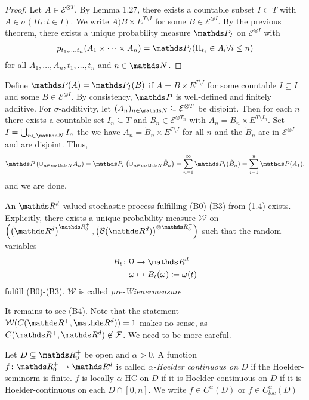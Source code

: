 \begin{proof}
Let $A \in \mathcal{E}^{\otimes T}$.
By Lemma 1.27, there exists a countable subset $I \subset T$ with $A \in \sigma(\Pi_t \colon t \in I)$.
We write $A)B \times E^{T \setminus I}$ for some $B \in \mathcal{E}^{\otimes I}$.
By the previous theorem, there exists a unique probability measure $\Prob_I$ on $\mathcal{E}^{\otimes I}$ with
\begin{align*}
p_{t_1,\dots,t_n}(A_1\times \dots \times A_n)=\Prob_I(\Pi_{t_i} \in A_i \forall i \leq n)
\end{align*}
for all $A_1,\dots,A_n,t_1,\dots,t_n$ and $n \in \N$.
\end{proof}
Define $\Prob(A)=\Prob_I(B)$ if $A=B \times E^{T\setminus I}$ for some countable $I\subseteq I$ and some $B \in \mathcal{E}^{\otimes I}$.
By consistency, $\Prob$ is well-defined and finitely additive.
For $\sigma$-additivity, let $(A_n)_{n\in \N}\subseteq \mathcal{E}^{\otimes T}$ be disjoint.
Then for each $n$ there exists a countable set $I_n \subseteq T$ and $B_n \in \mathcal{E}^{\otimes T_n}$ with $A_n=B_n \times E^{T\setminus I_n}$.
Set $I=\bigcup_{n\in \N}I_n$ the we have $A_n=\tilde{B}_n \times E^{T \setminus I}$ for all $n$ and the $\tilde{B}_n$ are in $\mathcal{E}^{\otimes I}$ and are disjoint.
Thus,
\begin{align*}
\Prob\left(\cup_{n \in \N}A_n\right)=\Prob_I \left( \cup_{n\in \N} \tilde{B}_n\right)=\sum_{n=1}^\infty \Prob_I(\tilde{B}_n)=\sum_{i=1}^n \Prob(A_1),
\end{align*}
and we are done.

\begin{cor}
An $\Rd$-valued stochastic process fulfilling (B0)-(B3) from (1.4) exists.
Explicitly, there exists a unique probability measure $\mathcal{W}$
on $\left(\left(\Rd\right)^{\R_0^+},\left(\Borel(\Rd)\right)^{\otimes \R_0^+}\right)$ such that the random variables
\begin{align*}
B_t \colon \Omega &\to \Rd\\
\omega &\mapsto B_t(\omega)\coloneqq \omega(t)
\end{align*}
fulfill (B0)-(B3). $\mathcal{W}$ is called \emph{pre-Wienermeasure}
\end{cor}
It remains to see (B4).
Note that the statement $\mathcal{W}(C(\R^+,\Rd))=1$ makes no sense, as $C(\R^+,\Rd)\not \in \mathcal{F}$. We need to be more careful.

\begin{defi}
Let $D\subseteq \R_0^+$ be open and $\alpha>0$.
A function $f \colon \R_0^+\to \Rd$ is called \emph{$\alpha$-Hoelder continuous on $D$} if the Hoelder-seminorm is finite.
$f$ is locally $\alpha$-HC on $D$ if it is Hoelder-continuous on $D$ if it is Hoelder-continuous on each $D \cap [0,n]$.
We write $f \in C^\alpha(D)$ or $f \in C_{loc}^\alpha(D)$
\end{defi}

